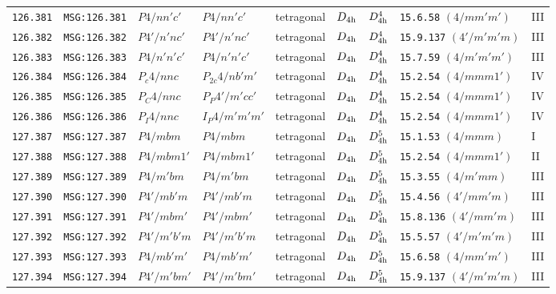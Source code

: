 \documentclass[fleqn,10pt]{jsarticle}
\begin{document}
\begin{center}
\begin{longtable}{lllllllll}
\texttt{126.381} & \texttt{MSG:126.381} & $P4/nn'c'$ & $P4/nn'c'$ & tetragonal & $D_{\rm 4h}$ & $D_{\rm 4h}^{4}$ & \texttt{15.6.58} $(4/mm'm')$ & III \\
\texttt{126.382} & \texttt{MSG:126.382} & $P4'/n'nc'$ & $P4'/n'nc'$ & tetragonal & $D_{\rm 4h}$ & $D_{\rm 4h}^{4}$ & \texttt{15.9.137} $(4'/m'm'm)$ & III \\
\texttt{126.383} & \texttt{MSG:126.383} & $P4/n'n'c'$ & $P4/n'n'c'$ & tetragonal & $D_{\rm 4h}$ & $D_{\rm 4h}^{4}$ & \texttt{15.7.59} $(4/m'm'm')$ & III \\
\texttt{126.384} & \texttt{MSG:126.384} & $P_{c}4/nnc$ & $P_{2c}4/nb'm'$ & tetragonal & $D_{\rm 4h}$ & $D_{\rm 4h}^{4}$ & \texttt{15.2.54} $(4/mmm1')$ & IV \\
\texttt{126.385} & \texttt{MSG:126.385} & $P_{C}4/nnc$ & $P_{P}4'/m'cc'$ & tetragonal & $D_{\rm 4h}$ & $D_{\rm 4h}^{4}$ & \texttt{15.2.54} $(4/mmm1')$ & IV \\
\texttt{126.386} & \texttt{MSG:126.386} & $P_{I}4/nnc$ & $I_{P}4/m'm'm'$ & tetragonal & $D_{\rm 4h}$ & $D_{\rm 4h}^{4}$ & \texttt{15.2.54} $(4/mmm1')$ & IV \\ \hline
\texttt{127.387} & \texttt{MSG:127.387} & $P4/mbm$ & $P4/mbm$ & tetragonal & $D_{\rm 4h}$ & $D_{\rm 4h}^{5}$ & \texttt{15.1.53} $(4/mmm)$ & I \\
\texttt{127.388} & \texttt{MSG:127.388} & $P4/mbm1'$ & $P4/mbm1'$ & tetragonal & $D_{\rm 4h}$ & $D_{\rm 4h}^{5}$ & \texttt{15.2.54} $(4/mmm1')$ & II \\
\texttt{127.389} & \texttt{MSG:127.389} & $P4/m'bm$ & $P4/m'bm$ & tetragonal & $D_{\rm 4h}$ & $D_{\rm 4h}^{5}$ & \texttt{15.3.55} $(4/m'mm)$ & III \\
\texttt{127.390} & \texttt{MSG:127.390} & $P4'/mb'm$ & $P4'/mb'm$ & tetragonal & $D_{\rm 4h}$ & $D_{\rm 4h}^{5}$ & \texttt{15.4.56} $(4'/mm'm)$ & III \\
\texttt{127.391} & \texttt{MSG:127.391} & $P4'/mbm'$ & $P4'/mbm'$ & tetragonal & $D_{\rm 4h}$ & $D_{\rm 4h}^{5}$ & \texttt{15.8.136} $(4'/mm'm)$ & III \\
\texttt{127.392} & \texttt{MSG:127.392} & $P4'/m'b'm$ & $P4'/m'b'm$ & tetragonal & $D_{\rm 4h}$ & $D_{\rm 4h}^{5}$ & \texttt{15.5.57} $(4'/m'm'm)$ & III \\
\texttt{127.393} & \texttt{MSG:127.393} & $P4/mb'm'$ & $P4/mb'm'$ & tetragonal & $D_{\rm 4h}$ & $D_{\rm 4h}^{5}$ & \texttt{15.6.58} $(4/mm'm')$ & III \\
\texttt{127.394} & \texttt{MSG:127.394} & $P4'/m'bm'$ & $P4'/m'bm'$ & tetragonal & $D_{\rm 4h}$ & $D_{\rm 4h}^{5}$ & \texttt{15.9.137} $(4'/m'm'm)$ & III \\

\end{longtable}
\end{center}
\end{document}
